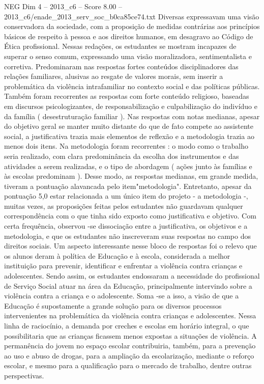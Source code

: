 \begin{textsample}{NEG Dim 4 – 2013\_c6 – Score 8.00 – 2013\_c6/enade\_2013\_serv\_soc\_b0ca85ce74.txt}
Diversas expressavam uma visão conservadora da sociedade, com a proposição de medidas contrárias aos princípios básicos de respeito à pessoa e aos direitos humanos, em desagravo ao Código de Ética profissional.
Nessas redações, os estudantes se mostram incapazes de superar o senso comum, expressando uma visão moralizadora, sentimentalista e corretiva.
Predominaram nas respostas fortes conteúdos disciplinadores das relações familiares, alusivas ao resgate de valores morais, sem inserir a problemática da violência intrafamiliar no contexto social e das políticas públicas.
Também foram recorrentes as respostas com forte conteúdo religioso, baseadas em discursos psicologizantes, de responsabilização e culpabilização do indivíduo e da família ( desestruturação familiar ).
Nas respostas com notas medianas, apesar do objetivo geral se manter muito distante do que de fato compete ao assistente social, a justificativa trazia mais elementos de reflexão e a metodologia trazia ao menos dois itens.
Na metodologia foram recorrentes : o modo como o trabalho seria realizado, com clara predominância da escolha dos instrumentos e das atividades a serem realizadas, e o tipo de abordagem ( ações junto às famílias e às escolas predominam ).
Desse modo, as respostas medianas, em grande medida, tiveram a pontuação alavancada pelo item"metodologia".
Entretanto, apesar da pontuação 5,0 estar relacionada a um único item do projeto - a metodologia -, muitas vezes, as proposições feitas pelos estudantes não guardavam qualquer correspondência com o que tinha sido exposto como justificativa e objetivo.
Com certa frequência, observou -se dissociação entre a justificativa, os objetivos e a metodologia, e que os estudantes não inscreveram suas respostas no campo dos direitos sociais.
Um aspecto interessante nesse bloco de respostas foi o relevo que os alunos deram à política de Educação e à escola, considerada a melhor instituição para prevenir, identificar e enfrentar a violência contra crianças e adolescentes.
Sendo assim, os estudantes endossaram a necessidade do profissional de Serviço Social atuar na área da Educação, principalmente intervindo sobre a violência contra a criança e o adolescente.
Soma -se a isso, a visão de que a Educação é supostamente a grande solução para os diversos processos intervenientes na problemática da violência contra crianças e adolescentes.
Nessa linha de raciocínio, a demanda por creches e escolas em horário integral, o que possibilitaria que as crianças ficassem menos expostas a situações de violência.
A permanência do jovem no espaço escolar contribuiria, também, para a prevenção ao uso e abuso de drogas, para a ampliação da escolarização, mediante o reforço escolar, e mesmo para a qualificação para o mercado de trabalho, dentre outras perspectivas.

\end{textsample}
